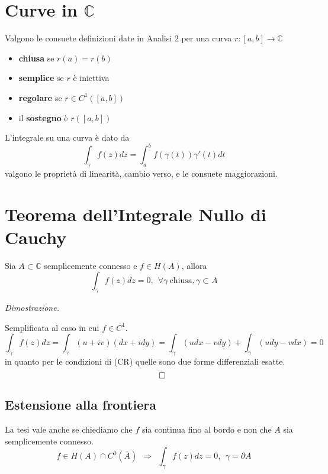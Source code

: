 \documentclass[10pt,a4paper,twoside]{book}
\begin{document}

\section{Curve in $\mathbb{C}$}

Valgono le consuete definizioni date in Analisi $2$ per una curva $r:[ a,b]\rightarrow \mathbb{C}$
\begin{itemize}
\item \textbf{chiusa} se $r( a) =r( b)$
\item \textbf{semplice} se $r$ è iniettiva
\item \textbf{regolare} se $r\in C^{1}([ a,b])$
\item il \textbf{sostegno} è $r([ a,b])$
\end{itemize}

L'integrale su una curva è dato da
\begin{equation*}
\int _{\gamma } f( z) dz=\int ^{b}_{a} f( \gamma ( t)) \gamma '( t) dt
\end{equation*}
valgono le proprietà di linearità, cambio verso, e le consuete maggiorazioni.
\section{Teorema dell'Integrale Nullo di Cauchy}
\begin{theorem}
 Sia $A\subset \mathbb{C}$ semplicemente connesso e $f\in H( A)$, allora
\begin{equation*}
\int _{\gamma } f( z) dz=0,\ \ \forall \gamma \ \text{chiusa} ,\gamma \subset A
\end{equation*}
\end{theorem}
\textit{Dimostrazione.}

Semplificata al caso in cui $f\in C^{1}$.
\begin{equation*}
\int _{\gamma } f( z) dz=\int _{\gamma }( u+iv)( dx+idy) =\int _{\gamma }( udx-vdy) +\int _{\gamma }( udy-vdx) =0
\end{equation*}
in quanto per le condizioni di (CR) quelle sono due forme differenziali esatte.
\begin{equation*}
\qed 
\end{equation*}
\subsection{Estensione alla frontiera}

La tesi vale anche se chiediamo che $f$ sia continua fino al bordo e non che $A$ sia semplicemente connesso.
\begin{equation*}
f\in H( A) \cap C^{0}(\overline{A}) \ \ \Rightarrow \ \ \int _{\gamma } f( z) dz=0,\ \ \gamma =\partial A
\end{equation*}
\end{document}
